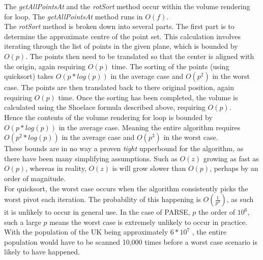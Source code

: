 The \textit{getAllPointsAt} and the \textit{rotSort} method occur within the volume rendering for loop. The  \textit{getAllPointsAt} method runs in  $O(f)$.\\

The \textit{rotSort} method is broken down into several parts. The first part is to determine the approximate centre of the point set. This calculation involves iterating through the list of points in the given plane, which is bounded by $O(p)$. The points then need to be translated so that the center is aligned with the origin, again requiring $O(p)$ time. The sorting of the points (using quicksort) takes $O(p * log(p))$ in the average case and $O(p^2)$ in the worst case. The points are then translated back to there original position, again requiring $O(p)$ time. Once the sorting has been completed, the volume is calculated using the Shoelace formula described above, requiring $O(p)$.\\

Hence the contents of the volume rendering for loop is bounded by $O(p * log(p))$ in the average case. Meaning the entire algorithm requires $O(p^2 * log(p))$ in the average case and $O(p^3)$ in the worst case. \\

These bounds are in no way a proven \textit{tight} upperbound for the algorithm, as there have been many simplifying assumptions. Such as $O(z)$ growing as fast as $O(p)$, whereas in reality, $O(z)$ is will grow slower than $O(p)$, perhaps by an order of magnitude.\\

For quicksort, the worst case occurs when the algorithm consistently picks the worst pivot each iteration. The probability of this happening is $O(\frac{1}{p^2})$, as such it is unlikely to occur in general use. In the case of PARSE, $p$ the order of $10^6$, such a large $p$ means the worst case is extremely unlikely to occur in practice. With the population of the UK being approximately $6 * 10^7$ \cite{UnitedKingdomofGreatBritain2011}, the entire population would have to be scanned 10,000 times before a worst case scenario is likely to have happened.